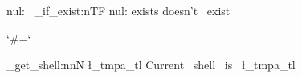 \documentclass{article}
\begin{document}
\ExplSyntaxOn
  { nul:~ \file_if_exist:nTF { nul: } { exists } { doesn't~ exist } }
\ExplSyntaxOff

\begingroup
\catcode`\#=\the\catcode`\a
\xdef\x{}
\endgroup

\ExplSyntaxOn
\sys_get_shell:nnN {\x} {} \l_tmpa_tl
 { Current~ shell~ is~ \l_tmpa_tl }
\ExplSyntaxOff
\end{document}
